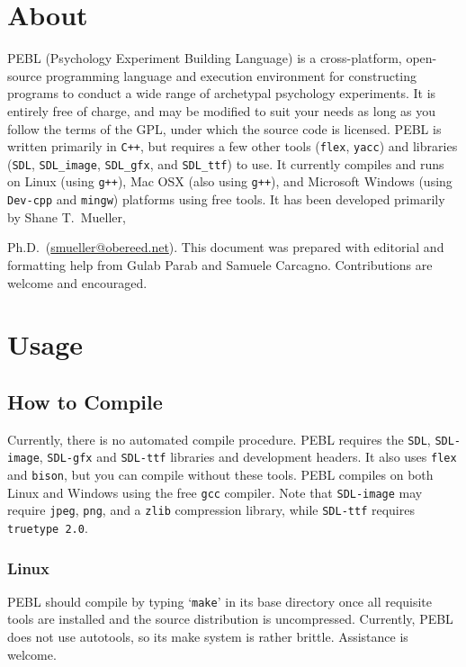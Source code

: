 \chapter{About}

PEBL (Psychology Experiment Building Language) is a cross-platform,
open-source programming language and execution environment for
constructing programs to conduct a wide range of archetypal psychology
experiments. It is entirely free of charge, and may be modified to
suit your needs as long as you follow the terms of the GPL, under
which the source code is licensed. PEBL is written primarily in
\texttt{C++}, but requires a few other tools (\texttt{flex},
\texttt{yacc}) and libraries (\texttt{SDL}, \texttt{SDL\_image},
\texttt{SDL\_gfx}, and \texttt{SDL\_ttf}) to use. It currently
compiles and runs on Linux (using \texttt{g++}), Mac OSX (also using
\texttt{g++}), and Microsoft Windows (using \texttt{Dev-cpp} and
\texttt{mingw}) platforms using free tools. It has been developed
primarily by Shane T.~Mueller,

Ph.D.~(\href{mailto:smueller@obereed.net}{smueller@obereed.net}).
This document was prepared with editorial and formatting help from
Gulab Parab and Samuele Carcagno. Contributions are welcome and
encouraged.

\chapter{Usage}

\section{How to Compile}

Currently, there is no automated compile procedure.  PEBL requires the
\texttt{SDL}, \texttt{SDL-image}, \texttt{SDL-gfx} and
\texttt{SDL-ttf} libraries and development headers.  It also uses
\texttt{flex} and \texttt{bison}, but you can compile without these
tools. PEBL compiles on both Linux and Windows using the free
\texttt{gcc} compiler. Note that \texttt{SDL-image} may require
\texttt{jpeg}, \texttt{png}, and a \texttt{zlib} compression library,
while \texttt{SDL-ttf} requires \texttt{truetype 2.0}.

\subsection{Linux}

PEBL should compile by typing `\texttt{make}' in its base directory
once all requisite tools are installed and the source distribution is
uncompressed. Currently, PEBL does not use autotools, so its make
system is rather brittle. Assistance is welcome.

